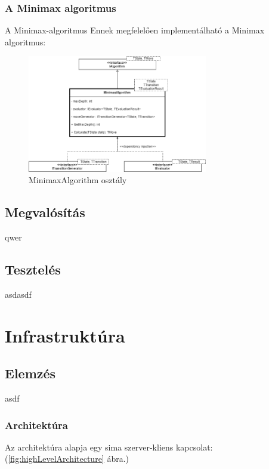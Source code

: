 \documentclass[twoside, a4paper, 12pt]{article}
\begin{document}
\subsubsection{A Minimax algoritmus}
A Minimax-algoritmus 
Ennek megfelelően implementálható a Minimax algoritmus:

\begin{figure}[htbp]
	\centering
	\includegraphics[width=0.7\textwidth]{img/minimaxAbstractDiagram.png}
	\caption{MinimaxAlgorithm osztály}
	\label{fig:minimaxAbstractDiagram}
\end{figure}






\subsection{Megvalósítás}
qwer

\subsection{Tesztelés}

asdasdf


\newpage
\section{Infrastruktúra}
\subsection{Elemzés}
asdf


















\subsubsection{Architektúra}
Az architektúra alapja egy sima szerver-kliens kapcsolat: (\ref{fig:highLevelArchitecture} ábra.)
\end{document}
